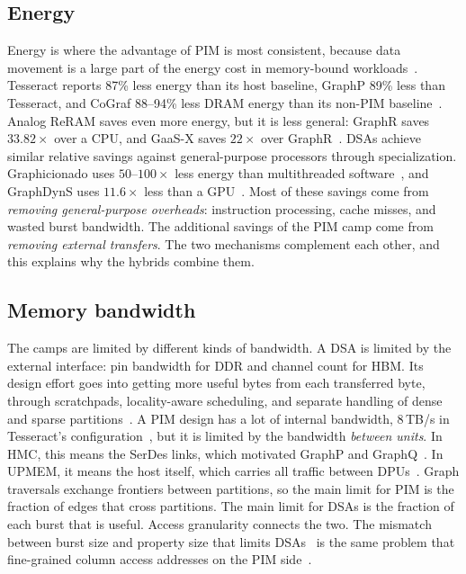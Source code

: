 \documentclass[journal,onecolumn]{IEEEtran}
\begin{document}
\subsection{Energy}
Energy is where the advantage of PIM is most consistent, because data movement is a large part of the energy cost in memory-bound workloads~\cite{gomezluna2022prim}. Tesseract reports 87\% less energy than its host baseline, GraphP 89\% less than Tesseract, and CoGraf 88--94\% less DRAM energy than its non-PIM baseline~\cite{ahn2015tesseract,zhang2018graphp,yenimol2026cograf}. Analog ReRAM saves even more energy, but it is less general: GraphR saves $33.82\times$ over a CPU, and GaaS-X saves $22\times$ over GraphR~\cite{song2018graphr,challapalle2020gaasx}. DSAs achieve similar relative savings against general-purpose processors through specialization. Graphicionado uses $50$--$100\times$ less energy than multithreaded software~\cite{ham2016graphicionado}, and GraphDynS uses $11.6\times$ less than a GPU~\cite{yan2019graphdyns}. Most of these savings come from \emph{removing general-purpose overheads}: instruction processing, cache misses, and wasted burst bandwidth. The additional savings of the PIM camp come from \emph{removing external transfers}. The two mechanisms complement each other, and this explains why the hybrids combine them.

\subsection{Memory bandwidth}
The camps are limited by different kinds of bandwidth. A DSA is limited by the external interface: pin bandwidth for DDR and channel count for HBM. Its design effort goes into getting more useful bytes from each transferred byte, through scratchpads, locality-aware scheduling, and separate handling of dense and sparse partitions~\cite{ham2016graphicionado,mukkara2018hats,chen2022regraph}. A PIM design has a lot of internal bandwidth, 8\,TB/s in Tesseract's configuration~\cite{ahn2015tesseract}, but it is limited by the bandwidth \emph{between units}. In HMC, this means the SerDes links, which motivated GraphP and GraphQ~\cite{zhang2018graphp,zhuo2019graphq}. In UPMEM, it means the host itself, which carries all traffic between DPUs~\cite{gomezluna2022prim}. Graph traversals exchange frontiers between partitions, so the main limit for PIM is the fraction of edges that cross partitions. The main limit for DSAs is the fraction of each burst that is useful. Access granularity connects the two. The mismatch between burst size and property size that limits DSAs~\cite{shin2025piccolo} is the same problem that fine-grained column access addresses on the PIM side~\cite{shin2025fala,yenimol2026cograf}.
\end{document}
